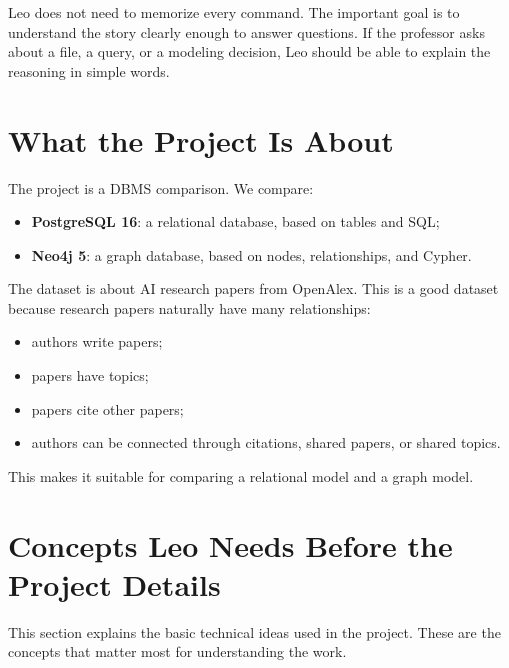 \documentclass[11pt]{article}
\begin{document}
Leo does not need to memorize every command.
The important goal is to understand the story clearly enough to answer questions.
If the professor asks about a file, a query, or a modeling decision, Leo should be able to explain the reasoning in simple words.

\section{What the Project Is About}

The project is a DBMS comparison.
We compare:

\begin{itemize}
    \item \textbf{PostgreSQL 16}: a relational database, based on tables and SQL;
    \item \textbf{Neo4j 5}: a graph database, based on nodes, relationships, and Cypher.
\end{itemize}

The dataset is about AI research papers from OpenAlex.
This is a good dataset because research papers naturally have many relationships:

\begin{itemize}
    \item authors write papers;
    \item papers have topics;
    \item papers cite other papers;
    \item authors can be connected through citations, shared papers, or shared topics.
\end{itemize}

This makes it suitable for comparing a relational model and a graph model.

\section{Concepts Leo Needs Before the Project Details}

This section explains the basic technical ideas used in the project.
These are the concepts that matter most for understanding the work.
\end{document}
